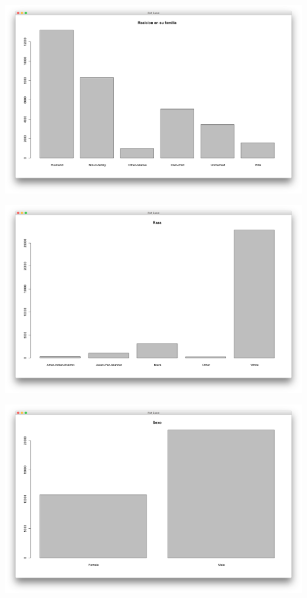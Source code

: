\documentclass{article}
\begin{document}
 \begin{center}
   \hbox{\hspace{-5.8em}\includegraphics[scale=0.4]{graficas/relacionEnSuFamilia}}
 \end{center}
 \begin{center}
   \hbox{\hspace{-5.8em}\includegraphics[scale=0.4]{graficas/raza}}
 \end{center}
 \begin{center}
   \hbox{\hspace{-5.8em}\includegraphics[scale=0.4]{graficas/sexo}}
 \end{center}
\end{document}
